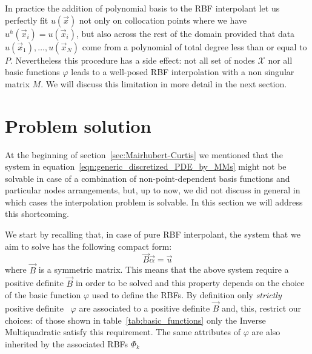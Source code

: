 In practice the addition of polynomial basis to the RBF interpolant let us perfectly fit $u(\vec{x})$ not only on collocation points where we have $u^h(\vec{x}_i)  = u(\vec{x}_i)$, but also across the rest of the domain provided that data $u(\vec{x}_1), \dots, u(\vec{x}_N)$ come from a polynomial of total degree less than or equal to $P$.  Nevertheless this procedure has a side effect: not all set of nodes $\mathcal{X}$ nor all basic functions $\varphi$ leads to a well-posed RBF interpolation with a non singular matrix $M$. We will discuss this limitation in more detail in the next section.



\section{Problem solution}
\label{sec:interpolation_prob_solution}

At the beginning of section~\ref{sec:Mairhubert-Curtis} we mentioned that the system in equation~\eqref{eqn:generic_discretized_PDE_by_MMs} might not be solvable in case of a combination of non-point-dependent basis functions and particular nodes arrangements, but, up to now, we did not discuss in general in which cases the interpolation problem is solvable. In this section we will address this shortcoming.

We start by recalling that, in case of pure RBF interpolant, the system that we aim to solve has the following compact form:
\begin{equation}
	\label{eqn:general_system_from_scattred_data_interpolation_compact_form}
	\vec{B} \vec{\alpha} = \vec{u}
\end{equation}
where $\vec{B}$ is a symmetric matrix.
This means that the above system require a positive definite $\vec{B}$ in order to be solved and this property depends on the choice of the basic function $\varphi$ used to define the RBFs. By definition only \emph{strictly} positive definite~\cite{Fasshauer:details_on_basic_functions} $\varphi$ are associated to a positive definite $\vec{B}$ and, this, restrict our choices: of those shown in table~\vref{tab:basic_functions} only the Inverse Multiquadratic satisfy this requirement. The same attributes of $\varphi$ are also inherited by the associated RBFs $\Phi_k$

